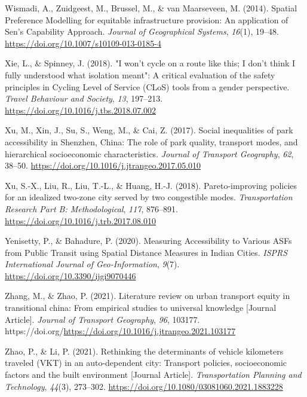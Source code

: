 \documentclass[
  letterpaper,
  DIV=11,
  numbers=noendperiod]{scrartcl}
\newlength{\cslhangindent}
\newenvironment{CSLReferences}[2] %
 {\begin{list}{}{%
  \setlength{\itemindent}{0pt}
  \setlength{\leftmargin}{0pt}
  \setlength{\parsep}{0pt}
  \ifodd #1
   \setlength{\leftmargin}{\cslhangindent}
   \setlength{\itemindent}{-1\cslhangindent}
  \fi
  \setlength{\itemsep}{#2\baselineskip}}}
 {\end{list}}
\begin{document}
\begin{CSLReferences}{1}{0}
Wismadi, A., Zuidgeest, M., Brussel, M., \& van Maarseveen, M. (2014).
Spatial {Preference Modelling} for equitable infrastructure provision:
An application of {Sen}'s {Capability Approach}. \emph{Journal of
Geographical Systems}, \emph{16}(1), 19--48.
\url{https://doi.org/10.1007/s10109-013-0185-4}

Xie, L., \& Spinney, J. (2018). "{I} won't cycle on a route like this;
{I} don't think {I} fully understood what isolation meant": {A} critical
evaluation of the safety principles in {Cycling Level} of {Service}
({CLoS}) tools from a gender perspective. \emph{Travel Behaviour and
Society}, \emph{13}, 197--213.
\url{https://doi.org/10.1016/j.tbs.2018.07.002}

Xu, M., Xin, J., Su, S., Weng, M., \& Cai, Z. (2017). Social
inequalities of park accessibility in {Shenzhen}, {China}: {The} role of
park quality, transport modes, and hierarchical socioeconomic
characteristics. \emph{Journal of Transport Geography}, \emph{62},
38--50. \url{https://doi.org/10.1016/j.jtrangeo.2017.05.010}

Xu, S.-X., Liu, R., Liu, T.-L., \& Huang, H.-J. (2018). Pareto-improving
policies for an idealized two-zone city served by two congestible modes.
\emph{Transportation Research Part B: Methodological}, \emph{117},
876--891. \url{https://doi.org/10.1016/j.trb.2017.08.010}

Yenisetty, P., \& Bahadure, P. (2020). Measuring {Accessibility} to
{Various ASFs} from {Public Transit} using {Spatial Distance Measures}
in {Indian Cities}. \emph{ISPRS International Journal of
Geo-Information}, \emph{9}(7). \url{https://doi.org/10.3390/ijgi9070446}

Zhang, M., \& Zhao, P. (2021). Literature review on urban transport
equity in transitional china: From empirical studies to universal
knowledge {[}Journal Article{]}. \emph{Journal of Transport Geography},
\emph{96}, 103177.
https://doi.org/\url{https://doi.org/10.1016/j.jtrangeo.2021.103177}

Zhao, P., \& Li, P. (2021). Rethinking the determinants of vehicle
kilometers traveled (VKT) in an auto-dependent city: Transport policies,
socioeconomic factors and the built environment {[}Journal Article{]}.
\emph{Transportation Planning and Technology}, \emph{44}(3), 273--302.
\url{https://doi.org/10.1080/03081060.2021.1883228}


\end{CSLReferences}
\end{document}
